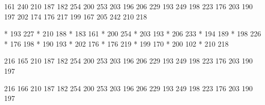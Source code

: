   161 240
  210 187
  182 254
  200 253
  203 196
  206 229
  193 249
  198 223
  176 203
  190 197
  202 174
  176 217
  199 167
  205 242
  210 218

* 193 227
* 210 188
* 183 161
* 200 254
* 203 193
* 206 233
* 194 189
* 198 226
* 176 198
* 190 193
* 202 176
* 176 219
* 199 170
* 200 102
* 210 218

  216 165
  210 187
  182 254
  200 253
  203 196
  206 229
  193 249
  198 223
  176 203
  190 197

  216 166
  210 187
  182 254
  200 253
  203 196
  206 229
  193 249
  198 223
  176 203
  190 197

\stopencoding

\endinput 
